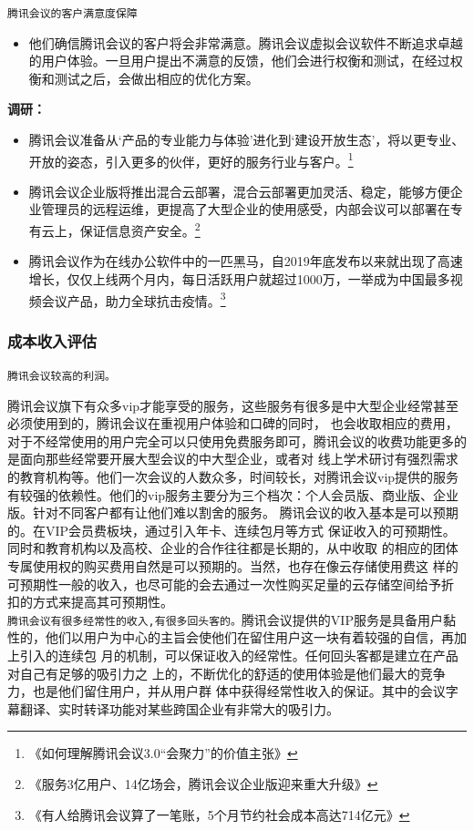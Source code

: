 \documentclass[a4paper,12pt]{article}
\begin{document}
\texttt{腾讯会议的客户满意度保障}

\begin{itemize}
  \item 他们确信腾讯会议的客户将会非常满意。腾讯会议虚拟会议软件不断追求卓越的用户体验。一旦用户提出不满意的反馈，他们会进行权衡和测试，在经过权衡和测试之后，会做出相应的优化⽅案。
\end{itemize}
\textbf{调研：}
\begin{itemize}
    \item 腾讯会议准备从‘产品的专业能力与体验’进化到‘建设开放生态’，将以更专业、开放的姿态，引入更多的伙伴，更好的服务行业与客户。\footnote{《如何理解腾讯会议3.0“会聚力”的价值主张》}
    \item 腾讯会议企业版将推出混合云部署，混合云部署更加灵活、稳定，能够方便企业管理员的远程运维，更提高了大型企业的使用感受，内部会议可以部署在专有云上，保证信息资产安全。\footnote{《服务3亿用户、14亿场会，腾讯会议企业版迎来重大升级》}
    \item 腾讯会议作为在线办公软件中的一匹黑马，自2019年底发布以来就出现了高速增长，仅仅上线两个月内，每日活跃用户就超过1000万，一举成为中国最多视频会议产品，助力全球抗击疫情。\footnote{《有人给腾讯会议算了一笔账，5个月节约社会成本高达714亿元》}
\end{itemize}
\subsubsection{成本收入评估}
\texttt{腾讯会议较高的利润。}


腾讯会议旗下有众多vip才能享受的服务，这些服务有很多是中大型企业经常甚至必须使用到的，腾讯会议在重视用户体验和口碑的同时，
也会收取相应的费用，对于不经常使用的用户完全可以只使用免费服务即可，腾讯会议的收费功能更多的是面向那些经常要开展大型会议的中大型企业，或者对
线上学术研讨有强烈需求的教育机构等。他们一次会议的人数众多，时间较长，对腾讯会议vip提供的服务有较强的依赖性。他们的vip服务主要分为三个档次：个人会员版、商业版、企业版。针对不同客户都有让他们难以割舍的服务。
腾讯会议的收入基本是可以预期的。在VIP会员费板块，通过引入年卡、连续包月等方式
保证收入的可预期性。同时和教育机构以及高校、企业的合作往往都是长期的，从中收取
的相应的团体专属使用权的购买费用自然是可以预期的。当然，也存在像云存储使用费这
样的可预期性一般的收入，也尽可能的会去通过一次性购买足量的云存储空间给予折
扣的方式来提高其可预期性。\\

\texttt{腾讯会议有很多经常性的收入,有很多回头客的。}腾讯会议提供的VIP服务是具备用户黏性的，他们以用户为中心的主旨会使他们在留住用户这一块有着较强的自信，再加上引入的连续包
月的机制，可以保证收入的经常性。任何回头客都是建立在产品对自己有足够的吸引力之
上的，不断优化的舒适的使用体验是他们最大的竞争力，也是他们留住用户，并从用户群
体中获得经常性收入的保证。其中的会议字幕翻译、实时转译功能对某些跨国企业有非常大的吸引力。\\
\end{document}
